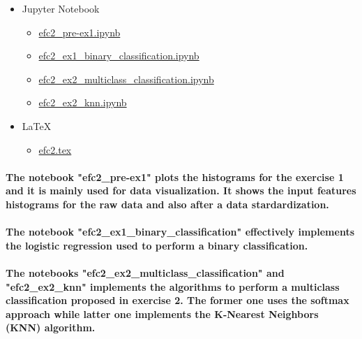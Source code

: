 \documentclass[a4paper]{article}
\begin{document}
\begin{itemize}
    \item Jupyter Notebook
    \begin{itemize}
        \item \href{https://github.com/ito-rafael/IA006C-MachineLearning/blob/master/efc2/efc2_pre-ex1.ipynb}{efc2\_pre-ex1.ipynb}
        \item \href{https://github.com/ito-rafael/IA006C-MachineLearning/blob/master/efc2/efc2_ex1_binary_classification.ipynb}{efc2\_ex1\_binary\_classification.ipynb}
        \item \href{https://github.com/ito-rafael/IA006C-MachineLearning/blob/master/efc2/efc2_ex2_multiclass_classification.ipynb}{efc2\_ex2\_multiclass\_classification.ipynb}
        \item \href{https://github.com/ito-rafael/IA006C-MachineLearning/blob/master/efc2/efc2_ex2_knn.ipynb}{efc2\_ex2\_knn.ipynb}
    \end{itemize}
    \item \LaTeX
    \begin{itemize}
        \item \href{https://github.com/ito-rafael/IA006C-MachineLearning/blob/master/efc2/LaTeX/efc2.tex}{efc2.tex}
    \end{itemize}
\end{itemize}

\paragraph{The notebook "efc2\_pre-ex1" plots the histograms for the exercise 1 and it is mainly used for data visualization. It shows the input features histograms for the raw data and also after a data stardardization.}

\paragraph{The notebook "efc2\_ex1\_binary\_classification" effectively implements the logistic regression used to perform a binary classification.}

\paragraph{The notebooks "efc2\_ex2\_multiclass\_classification" and "efc2\_ex2\_knn" implements the algorithms to perform a multiclass classification proposed in exercise 2. The former one uses the softmax approach while latter one implements the K-Nearest Neighbors (KNN) algorithm.}
\end{document}
